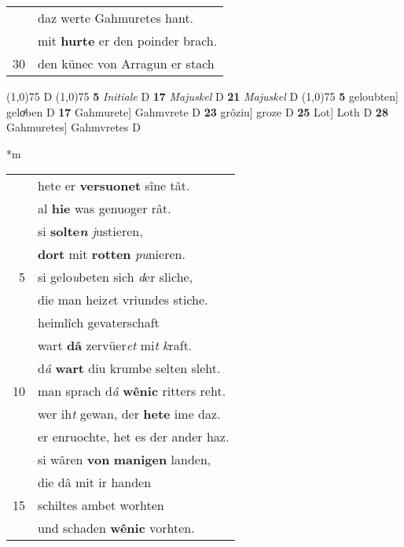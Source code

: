 \documentclass[8pt,a4paper,notitlepage]{article}
\begin{document}
\begin{table}[ht]
\begin{minipage}[t]{0.5\linewidth}
\begin{tabular}{rl}
 & daz werte Gahmuretes hant.\\ 
 & mit \textbf{hurte} er den poinder brach.\\ 
30 & den künec von Arragun er stach\\ 
\end{tabular}
\scriptsize
\line(1,0){75} \newline
D \newline
\line(1,0){75} \newline
\textbf{5} \textit{Initiale} D  \textbf{17} \textit{Majuskel} D  \textbf{21} \textit{Majuskel} D  \newline
\line(1,0){75} \newline
\textbf{5} geloubten] geloͮben D \textbf{17} Gahmurete] Gahmvrete D \textbf{23} grôziu] groze D \textbf{25} Lot] Loth D \textbf{28} Gahmuretes] Gahmvretes D \newline
\end{minipage}
\hspace{0.5cm}
\begin{minipage}[t]{0.5\linewidth}
\small
\begin{center}*m
\end{center}
\begin{tabular}{rl}
 & hete er \textbf{versuonet} sîne tât.\\ 
 & al \textbf{hie} was genuoger rât.\\ 
 & si \textbf{solte\textit{n}} \textit{j}ustieren,\\ 
 & \textbf{dort} mit \textbf{rotten} \textit{pu}nieren.\\ 
5 & si gelo\textit{u}beten sich \textit{d}er sliche,\\ 
 & die man heiz\textit{e}t vriundes stiche.\\ 
 & heimlîch gevaterschaft\\ 
 & wart \textbf{dâ} zervüer\textit{et} mi\textit{t} \textit{k}raft.\\ 
 & d\textit{â} \textbf{wart} diu krumbe selten sleht.\\ 
10 & man sprach d\textit{â} \textbf{wênic} ritters reht.\\ 
 & wer ih\textit{t} gewan, der \textbf{hete} ime daz.\\ 
 & er enruochte, het es der ander haz.\\ 
 & si wâren \textbf{von} \textbf{manigen} landen,\\ 
 & die dâ mit ir handen\\ 
15 & schiltes ambet worhten\\ 
 & und schaden \textbf{wênic} vorhten.\\ 

\end{tabular}
\end{minipage}
\end{table}
\end{document}
